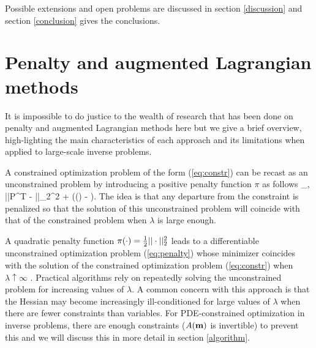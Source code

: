 \documentclass{iopart}
\begin{document}
Possible extensions and open problems are discussed in section
\ref{discussion} and section \ref{conclusion} gives the conclusions.


\section{Penalty and augmented Lagrangian methods}
\label{penalty}
It is impossible to do justice to the wealth of research that has been done on penalty and augmented Lagrangian methods here
but we give a brief overview, high-lighting the main characteristics of each approach and its limitations when applied to large-scale inverse problems. 

A constrained optimization problem of the form (\ref{eq:constr})
can be recast as an unconstrained problem by introducing a positive penalty function $\pi$ as follows
\bq
\label{eq:penalty}
\min_{,} ||P^T - ||_2^2 + \lambda\pi(() - ).
\eq
The idea is that any departure from the constraint is penalized so that the solution of this 
unconstrained problem will coincide with that of the constrained problem when $\lambda$ is large enough.

A quadratic penalty function $\pi(\cdot) = {\textstyle\frac{1}{2}}||\cdot||_2^2$ leads to a differentiable 
unconstrained optimization problem (\ref{eq:penalty}) whose minimizer coincides with the solution
of the constrained optimization problem (\ref{eq:constr}) when $\lambda \uparrow \infty$ \cite[Thm. 17.1]{Nocedal}. 
Practical algorithms rely on repeatedly solving the unconstrained problem for increasing values of $\lambda$.
A common concern with this approach is that the Hessian may become increasingly ill-conditioned 
for large values of $\lambda$ when there are fewer constraints than variables. For PDE-constrained 
optimization in inverse problems, there are enough constraints ($A(\mathbf{m})$ is invertible) to prevent this and we will
discuss this in more detail in section \ref{algorithm}.
\end{document}
